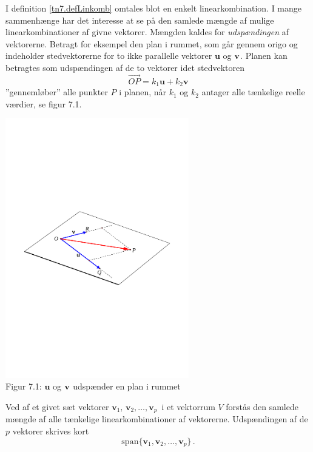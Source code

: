 I definition \ref{tn7.defLinkomb} omtales blot en enkelt linearkombination. I mange sammenhænge har det interesse at se på den samlede mængde af mulige linearkombinationer af givne vektorer. Mængden kaldes for \textit{udspændingen} af vektorerne. Betragt for eksempel den plan i rummet, som går gennem origo og indeholder stedvektorerne for to ikke parallelle vektorer $\mathbf u$ og $\mathbf{v}$. Planen kan betragtes som udspændingen af de to vektorer idet stedvektoren $$\stackrel{\rightarrow}{OP}=k_1\mathbf u +k_2\mathbf v$$ ''gennemløber'' alle punkter $P$ i planen, når $k_1$ og $k_2$ antager alle tænkelige reelle værdier, se figur 7.1.   
\begin{center}
		\includegraphics[trim=2cm 10cm 2cm
 10cm,width=0.60\textwidth,clip]{vektor14.pdf}
  \\Figur 7.1: $\mathbf u$ og $\mathbf{v}$ udspænder en plan i rummet		
\end{center}

\begin{definition}\label{tn7.defSpan}
Ved  af et givet sæt vektorer  ${\mathbf v}_1,\,{\mathbf v}_2,\ldots,{\mathbf v}_p\,$ i et vektorrum $V$ forstås den samlede mængde af alle tænkelige linearkombinationer af vektorerne. Udspændingen af de $p$ vektorer skrives kort
$$
\mathrm{span}\{\mathbf v_1,\mathbf v_2,\ldots,\mathbf v_p\}\,.
$$
\end{definition}

